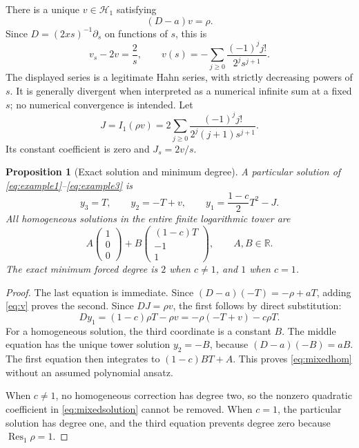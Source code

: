 \documentclass[11pt,a4paper]{article}
\numberwithin{equation}{section}
\newtheorem{proposition}[theorem]{Proposition}
\theoremstyle{definition}
\theoremstyle{remark}\newtheorem{remark}[theorem]{Remark}
\newcommand{\R}{\mathbb R}\newcommand{\C}{\mathbb C}
\newcommand{\Hh}{\mathcal H}\newcommand{\Ll}{\mathcal L}
\newcommand{\Res}{\operatorname{Res}}\newcommand{\supp}{\operatorname{supp}}
\begin{document}
There is a unique $v\in\Hh_1$ satisfying
\begin{equation}
 (D-a)v=\rho.
 \label{eq:v}
\end{equation}
Since $D=(2xs)^{-1}\partial_s$ on functions of $s$, this is
\begin{equation}
 v_s-2v=\frac2s,
 \qquad
 v(s)=-\sum_{j\ge0}\frac{(-1)^j j!}{2^j s^{j+1}}.
 \label{eq:vseries}
\end{equation}
The displayed series is a legitimate Hahn series, with strictly decreasing powers of $s$. It is generally divergent when interpreted as a numerical infinite sum at a fixed $s$; no numerical convergence is intended. Let
\begin{equation}
 J=I_1(\rho v)
 =2\sum_{j\ge0}\frac{(-1)^j j!}{2^j(j+1)s^{j+1}}.
 \label{eq:Jseries}
\end{equation}
Its constant coefficient is zero and $J_s=2v/s$.

\begin{proposition}[Exact solution and minimum degree]
\label{prop:mixed}
A particular solution of \eqref{eq:example1}--\eqref{eq:example3} is
\begin{equation}
 y_3=T,\qquad y_2=-T+v,\qquad
 y_1=\frac{1-c}{2}T^2-J.
 \label{eq:mixedsolution}
\end{equation}
All homogeneous solutions in the entire finite logarithmic tower are
\begin{equation}
 A\begin{pmatrix}1\\0\\0\end{pmatrix}
 +B\begin{pmatrix}(1-c)T\\-1\\1\end{pmatrix},
 \qquad A,B\in\R.
 \label{eq:mixedhom}
\end{equation}
The exact minimum forced degree is $2$ when $c\ne1$, and $1$ when $c=1$.
\end{proposition}
\begin{proof}
The last equation is immediate. Since $(D-a)(-T)=-\rho+aT$, adding \eqref{eq:v} proves the second. Since $DJ=\rho v$, the first follows by direct substitution:
\[
 Dy_1=(1-c)\rho T-\rho v
       =-\rho(-T+v)-c\rho T.
\]
For a homogeneous solution, the third coordinate is a constant $B$. The middle equation has the unique tower solution $y_2=-B$, because $(D-a)(-B)=aB$. The first equation then integrates to $(1-c)BT+A$. This proves \eqref{eq:mixedhom} without an assumed polynomial ansatz.

When $c\ne1$, no homogeneous correction has degree two, so the nonzero quadratic coefficient in \eqref{eq:mixedsolution} cannot be removed. When $c=1$, the particular solution has degree one, and the third equation prevents degree zero because $\Res_1\rho=1$.
\end{proof}
\end{document}
